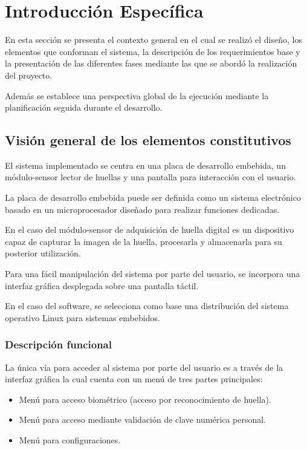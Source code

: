 \chapter{Introducción Específica} %

\label{Chapter2}

En esta sección se presenta el contexto general en el cual se realizó el diseño, los elementos que conforman el sistema, la descripción de los requerimientos base y la presentación de las diferentes fases mediante las que se abordó la realización del proyecto.

Además se establece una perspectiva global de la ejecución mediante la planificación seguida durante el desarrollo.
  
\section{Visión general de los elementos constitutivos}
El sistema implementado se centra en una placa de desarrollo embebida, un módulo-sensor lector de huellas y una pantalla para interacción con el usuario.

La placa de desarrollo embebida puede ser definida como un sistema electrónico basado en un microprocesador diseñado para realizar funciones dedicadas.

En el caso del módulo-sensor de adquisición de huella digital es un dispositivo capaz de capturar la imagen de la huella, procesarla y almacenarla para su posterior utilización.

Para una fácil manipulación del sistema por parte del usuario, se incorpora una interfaz gráfica desplegada sobre una pantalla táctil.

En el caso del software, se selecciona como base una distribución del sistema operativo Linux para sistemas embebidos.

\subsection{Descripción funcional}
La única vía para acceder al sistema por parte del usuario es a través de la interfaz gráfica la cual cuenta con un menú  de tres partes principales:

\begin{itemize}
\item Menú para acceso biométrico (acceso por reconocimiento de huella).	
\item Menú para acceso mediante validación de clave numérica personal.
\item Menú para configuraciones.
\end{itemize}

